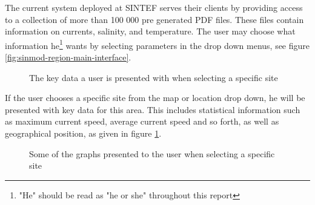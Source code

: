 \documentclass[11pt,a4paper,titlepage,oneside]{report}
\begin{document}
The current system deployed at SINTEF serves their clients by providing access to a collection of more than 100 000 pre generated PDF files. These files contain information on currents, salinity, and temperature. The user may choose what information he\footnote{"He" should be read as "he or she" throughout this report} wants by selecting parameters in the drop down menus, see figure \ref{fig:sinmod-region-main-interface}.

\begin{figure}[h]
\begin{center}
\caption{The key data a user is presented with when selecting a specific site}
\label{fig:sinmod-site-key-data}
\end{center}
\end{figure}

If the user chooses a specific site from the map or location drop down, he will be presented with key data for this area. This includes statistical information such as maximum current speed, average current speed and so forth, as well as geographical position, as given in figure \ref{fig:sinmod-site-key-data}.


\begin{figure}[h]
\begin{center}
\caption{Some of the graphs presented to the user when selecting a specific site}
\label{fig:sinmod-site-graphs}
\end{center}
\end{figure}
\end{document}
